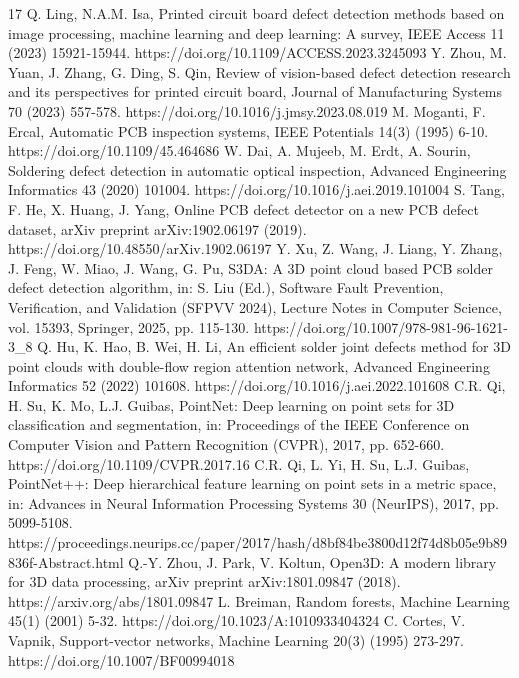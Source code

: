 \documentclass[3p]{elsarticle}
\begin{document}
\begin{thebibliography}{17}\footnotesize
{}Q. Ling, N.A.M. Isa, Printed circuit board defect detection methods based on image processing, machine learning and deep learning: A survey, IEEE Access 11 (2023) 15921-15944. https://doi.org/10.1109/ACCESS.2023.3245093
Y. Zhou, M. Yuan, J. Zhang, G. Ding, S. Qin, Review of vision-based defect detection research and its perspectives for printed circuit board, Journal of Manufacturing Systems 70 (2023) 557-578. https://doi.org/10.1016/j.jmsy.2023.08.019
M. Moganti, F. Ercal, Automatic PCB inspection systems, IEEE Potentials 14(3) (1995) 6-10. https://doi.org/10.1109/45.464686
W. Dai, A. Mujeeb, M. Erdt, A. Sourin, Soldering defect detection in automatic optical inspection, Advanced Engineering Informatics 43 (2020) 101004. https://doi.org/10.1016/j.aei.2019.101004
S. Tang, F. He, X. Huang, J. Yang, Online PCB defect detector on a new PCB defect dataset, arXiv preprint arXiv:1902.06197 (2019). https://doi.org/10.48550/arXiv.1902.06197
Y. Xu, Z. Wang, J. Liang, Y. Zhang, J. Feng, W. Miao, J. Wang, G. Pu, S3DA: A 3D point cloud based PCB solder defect detection algorithm, in: S. Liu (Ed.), Software Fault Prevention, Verification, and Validation (SFPVV 2024), Lecture Notes in Computer Science, vol. 15393, Springer, 2025, pp. 115-130. https://doi.org/10.1007/978-981-96-1621-3\_8
Q. Hu, K. Hao, B. Wei, H. Li, An efficient solder joint defects method for 3D point clouds with double-flow region attention network, Advanced Engineering Informatics 52 (2022) 101608. https://doi.org/10.1016/j.aei.2022.101608
C.R. Qi, H. Su, K. Mo, L.J. Guibas, PointNet: Deep learning on point sets for 3D classification and segmentation, in: Proceedings of the IEEE Conference on Computer Vision and Pattern Recognition (CVPR), 2017, pp. 652-660. https://doi.org/10.1109/CVPR.2017.16
C.R. Qi, L. Yi, H. Su, L.J. Guibas, PointNet++: Deep hierarchical feature learning on point sets in a metric space, in: Advances in Neural Information Processing Systems 30 (NeurIPS), 2017, pp. 5099-5108. https://proceedings.neurips.cc/paper/2017/hash/d8bf84be3800d12f74d8b05e9b89836f-Abstract.html
Q.-Y. Zhou, J. Park, V. Koltun, Open3D: A modern library for 3D data processing, arXiv preprint arXiv:1801.09847 (2018). https://arxiv.org/abs/1801.09847
L. Breiman, Random forests, Machine Learning 45(1) (2001) 5-32. https://doi.org/10.1023/A:1010933404324
C. Cortes, V. Vapnik, Support-vector networks, Machine Learning 20(3) (1995) 273-297. https://doi.org/10.1007/BF00994018

\end{thebibliography}
\end{document}
